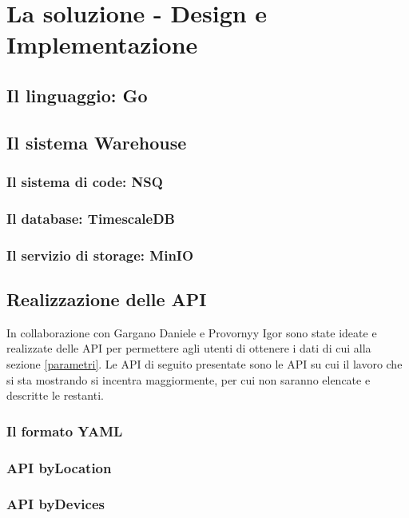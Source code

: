 \chapter{La soluzione - Design e Implementazione}

\section{Il linguaggio: Go}


\section{Il sistema Warehouse}

\subsection{Il sistema di code: NSQ}

\subsection{Il database: TimescaleDB}

\subsection{Il servizio di storage: MinIO}


\section{Realizzazione delle API}

In collaborazione con Gargano Daniele e Provornyy Igor sono state ideate e realizzate delle API per permettere agli utenti di ottenere i dati di cui alla sezione \ref{parametri}. Le API di seguito presentate sono le API su cui il lavoro che si sta mostrando si incentra maggiormente, per cui non saranno elencate e descritte le restanti.

\subsection{Il formato YAML}

\subsection{API byLocation}

\subsection{API byDevices}


